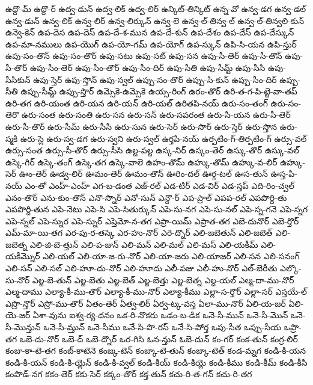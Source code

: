 {ఉద్దొ-మ్
ఉద్దొ-ర్
ఉద్వ-డున్
ఉద్వ-లిక్
ఉద్వ-లిర్
ఉన్కిట్-తిన్కిట్
ఉన్న-వో
ఉన్వ-డగ
ఉన్వ-డల్
ఉన్వ-డున్
ఉన్వ-లిక్
ఉన్వ-లిర్
ఉన్వ-లిర్కున్
ఉన్వ-లె
ఉన్వ-ల్-తిన్వ-ల్
ఉన్వ-ల్-తిన్వలి-కున్
ఉన్వె-కెన్
ఉప-దెస
ఉప-దెస్
ఉప-దే-శ-మున
ఉప-దే-శున్
ఉప-దేశం
ఉప-దేస్
ఉప-దేస్కున్
ఉప-మా-నములు
ఉప-యొగ్
ఉప-యో-గమ్
ఉప-యోగ్
ఉప-స్కున్
ఉపి-సి-యన
ఉపి-స్తుర్
ఉపు-సం-తొన్
ఉపు-సం-తొర్
ఉపు-సటు
ఉపు-సట్
ఉపు-సన
ఉపు-సీ-తెర్
ఉపు-సీ-తొన్
ఉపు-సీ-తొర్
ఉపు-సీం-తెర్
ఉపు-సీం-తొర్
ఉపు-సీం-దిర్
ఉపు-సీతి
ఉపు-సీమ్ట్
ఉపు-సీసి
ఉపు-సీసికున్
ఉపు-స్తెర్
ఉపు-స్తొన్
ఉపు-స్వల్
ఉప్పు-సం-తొర్
ఉప్పు-సి-కున్
ఉప్పు-సీం-దిర్
ఉప్పు-సీతి
ఉప్పు-సీమ్ట్
ఉప్పు-స్తొర్
ఉమ్సెకె-ఉమ్సెకె
ఉయ్స-రింగ్
ఉరం-తొర్
ఉరి-త-గ-పి-ట్టె-వా-తప్
ఉరి-తగ
ఉరి-యంత
ఉరి-యన
ఉరి-యన్
ఉరి-యల్
ఉరితపి-నయ్
ఉరు-సం-తంగ్
ఉరు-సం-తెరొ
ఉరు-సంత
ఉరు-సంతి
ఉరు-సన
ఉరు-సన్
ఉరు-సపరంత
ఉరు-సి-యన
ఉరు-సీ-తెర్
ఉరు-సీ-తొర్
ఉరు-సీమ్
ఉరు-సీసి
ఉరు-సున
ఉరు-సెర్
ఉరు-సొర్
ఉరు-స్తెర్
ఉరు-స్తొన
ఉరు-స్మకి
ఉరు-స్లె
ఉరు-స్వ-డగ
ఉరు-స్వని
ఉరు-స్వల్
ఉర్తపి-నయ్
ఉర్పటిం-గ్-తిర్పటిం-గ్
ఉర్సు-వల్
ఉర్సు-సంత
ఉర్సు-సీ-తొర్
ఉర్సు-సీసి
ఉల్ట-పల్ట
ఉస్క-నిర్
ఉస్కం-తెర్
ఉస్కు-తొర్
ఉస్కు-వల్
ఉస్కె-గిర్
ఉస్కె-తంగ్
ఉస్కె-తగ
ఉస్కె-వాలె
ఉహం-తొమ్
ఉహ్కు-తొమ్
ఉహ్కు-వ-లిర్
ఉహ్కు-సెర్
ఊం-తెర్
ఊడ్వ-లిర్
ఊమం-తెర్
ఊమం-తొన్
ఊరిం-దల్
ఊర్గ-టల్
ఊస-తున్
ఊస్త-పి-నయ్
ఎం-తో
ఎంహ్-ఎంహ్
ఎగ-బ-డంత
ఎజ్-రల్
ఎడ-టిర్
ఎడ-విర్
ఎడ-స్తప్
ఎది-రిం-చ్వల్
ఎనం-తొర్
ఎను-కుం-తొన్
ఎనొ-స్నొర్
ఎనో-సున్
ఎన్దొ-ర్
ఎప-ప్రాల్
ఎపప-రల్
ఎపపొర్ది-తు
ఎపపొర్ది-తున
ఎపె-నెటు
ఎపె-సి
ఎపె-సితుర్కున్
ఎపె-సు-నగ
ఎపె-సు-నల్
ఎపె-స్న-గనె
ఎపె-స్నగ
ఎపె-స్నల్
ఎపె-స్నుర
ఎపె-స్నుర్
ఎప్తెమో-న-తగ
ఎప్రా-యిమ్
ఎప్రాత-తగ
ఎబె-దునొర్
ఎబె-ర్తొర్
ఎమ్-మా-యి-తగ
ఎర-పు-ర-తస్కె
ఎర-హు-నొర్
ఎరె-ద్నొర్
ఎలి-జబెతున్
ఎలి-జబెత్
ఎలి-జబెత్న
ఎలి-జి-బె-త్తున్
ఎలి-ప-జున్
ఎలి-మన్
ఎలి-మల్
ఎలి-మస్
ఎలి-యకీమ్
ఎలి-యకీమ్నొర్
ఎలి-యల్
ఎలి-యా-జ-రు-నొర్
ఎలి-యా-జరు
ఎలి-యాజర్
ఎలి-సన
ఎలి-సనంగ్
ఎలి-సన్
ఎలి-సల్
ఎలి-హూ-దు-నొర్
ఎలి-హూదు
ఎలీ-పజు
ఎలీ-హు-నొర్
ఎల్-బెరీతు
ఎల్కొ-సు-నొర్
ఎల్జ-బె-తున్
ఎల్జ-బెతు
ఎల్జ-బెత్
ఎల్జ-బెత్తు
ఎల్జ-బెత్న
ఎల్ద-యల్
ఎల్మ-దా-ము-నొర్
ఎల్మ-దాము
ఎల్యా-కీ-ము-తొర్
ఎల్యా-కీ-ము-నొర్
ఎల్యా-కీము
ఎల్లా-స-ర్తొర్
ఎల్లా-సర్
ఎస్తయే-ల్
ఎస్రొ-న్తొర్
ఎస్రో-ము-తొర్
ఏతం-తెర్
ఏత్వ-లిర్
ఏర్వ-ట్క-వస్త
ఏలా-ము-నొర్
ఏలి-య-జర్
ఏలి-యె-జర్
ఏశా-వును
ఐశ్వ-ర్య-దనం
ఒక-రి-నొకరు
ఒడం-బ-డిక
ఒనె-సీ-మున్
ఒనె-సీ-మొన్
ఒనె-సీ-మొన్తున్
ఒనె-సీ-మ్తున్
ఒనె-సీము
ఒనే-సి-పొ-రస్
ఒనే-సి-పోర్త
ఒపు-సీత
ఒప్పు-సీయ
ఒప్రొ-తగ
ఒబె-దు-నొర్
ఒబె-ద్
ఒబె-ద్నొర్
ఒర-గిసి
ఓన-న్తున్
ఓబె-దున్
కం-గర్
కంక-తున్
కంగ్ర-లిర్
కంజు-కా-టె-తగ
కంజ్-కాటెనె
కంజ్క-టెన్
కంజ్కా-టె-తున్
కంజ్కా-టెత్
కండ-మ్నగ
కండి-కి-యన
కండి-కి-యన్
కండి-కి-య్లెన్
కండి-కి-వ్వల్
కండి-కియ్
కండి-కియ్లె
కండి-కీము
కండి-కీమ్
కండి-కీసి
కంపొడ్-నగ
కకం-తెర్
కకు-సెర్
కక్కం-తొర్
కక్త-తున్
కచు-రి-త-గన్
కచు-రి-తగ
}
